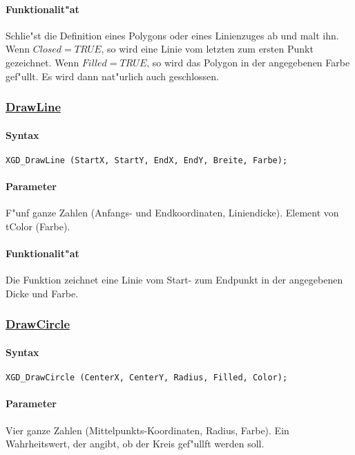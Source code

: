 \paragraph{Funktionalit"at}
Schlie"st die Definition eines Polygons oder eines Linienzuges ab und malt ihn.
Wenn $Closed = TRUE$, so wird eine Linie vom letzten zum ersten Punkt
gezeichnet. Wenn $Filled = TRUE$, so wird das Polygon in der angegebenen Farbe
gef"ullt. Es wird dann nat"urlich auch geschlossen.


\subsubsection{\underline{DrawLine}}

\paragraph{Syntax}
\begin{verbatim}
XGD_DrawLine (StartX, StartY, EndX, EndY, Breite, Farbe);
\end{verbatim}

\paragraph{Parameter}
F"unf ganze Zahlen (Anfangs- und Endkoordinaten, Liniendicke).
Element von tColor (Farbe).


\paragraph{Funktionalit"at}
Die Funktion zeichnet eine Linie vom Start- zum Endpunkt in der angegebenen
Dicke und Farbe.


\subsubsection{\underline{DrawCircle}}

\paragraph{Syntax}
\begin{verbatim}
XGD_DrawCircle (CenterX, CenterY, Radius, Filled, Color);
\end{verbatim}

\paragraph{Parameter}
Vier ganze Zahlen (Mittelpunkts-Koordinaten, Radius, Farbe).
Ein Wahrheitswert, der angibt, ob der Kreis gef"ullft werden soll.

